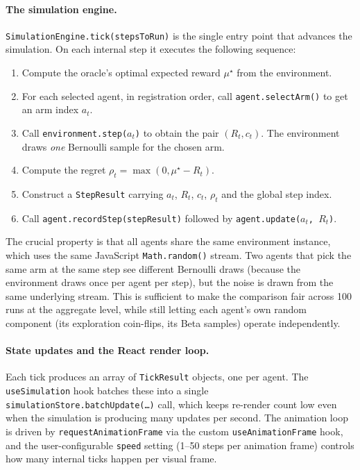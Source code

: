 \paragraph{The simulation engine.}
\texttt{SimulationEngine.tick(stepsToRun)} is the single entry point that advances the simulation. On each internal step it executes the following sequence:
\begin{enumerate}\itemsep0pt
  \item Compute the oracle's optimal expected reward $\mu^\star$ from the environment.
  \item For each selected agent, in registration order, call \texttt{agent.selectArm()} to get an arm index $a_t$.
  \item Call \texttt{environment.step($a_t$)} to obtain the pair $(R_t, c_t)$. The environment draws \emph{one} Bernoulli sample for the chosen arm.
  \item Compute the regret $\rho_t = \max(0, \mu^\star - R_t)$.
  \item Construct a \texttt{StepResult} carrying $a_t$, $R_t$, $c_t$, $\rho_t$ and the global step index.
  \item Call \texttt{agent.recordStep(stepResult)} followed by \texttt{agent.update($a_t$, $R_t$)}.
\end{enumerate}
The crucial property is that all agents share the same environment instance, which uses the same JavaScript \texttt{Math.random()} stream. Two agents that pick the same arm at the same step see different Bernoulli draws (because the environment draws once per agent per step), but the noise is drawn from the same underlying stream. This is sufficient to make the comparison fair across 100 runs at the aggregate level, while still letting each agent's own random component (its exploration coin-flips, its Beta samples) operate independently.

\paragraph{State updates and the React render loop.}
Each tick produces an array of \texttt{TickResult} objects, one per agent. The \texttt{useSimulation} hook batches these into a single \texttt{simulationStore.batchUpdate(\ldots)} call, which keeps re-render count low even when the simulation is producing many updates per second. The animation loop is driven by \texttt{requestAnimationFrame} via the custom \texttt{useAnimationFrame} hook, and the user-configurable \texttt{speed} setting (1--50 steps per animation frame) controls how many internal ticks happen per visual frame.

